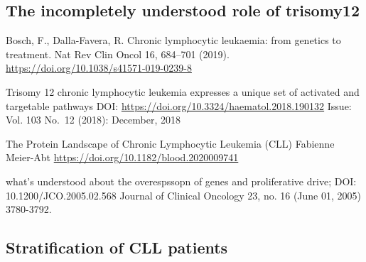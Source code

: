 \documentclass[11pt, a4paper, twosided]{book}
\begin{document}
\hypertarget{the-incompletely-understood-role-of-trisomy12}{%
\subsection{The incompletely understood role of trisomy12}\label{the-incompletely-understood-role-of-trisomy12}}

Bosch, F., Dalla-Favera, R. Chronic lymphocytic leukaemia: from genetics to treatment. Nat Rev Clin Oncol 16, 684--701 (2019). \url{https://doi.org/10.1038/s41571-019-0239-8}

Trisomy 12 chronic lymphocytic leukemia expresses a unique set of activated and targetable pathways
DOI: \url{https://doi.org/10.3324/haematol.2018.190132}
Issue: Vol. 103 No.~12 (2018): December, 2018

The Protein Landscape of Chronic Lymphocytic Leukemia (CLL)
Fabienne Meier-Abt \url{https://doi.org/10.1182/blood.2020009741}

what's understood about the overespssopn of genes and proliferative drive;
DOI: 10.1200/JCO.2005.02.568 Journal of Clinical Oncology 23, no. 16 (June 01, 2005) 3780-3792.

\hypertarget{stratification-of-cll-patients}{%
\subsection{Stratification of CLL patients}\label{stratification-of-cll-patients}}
\end{document}
